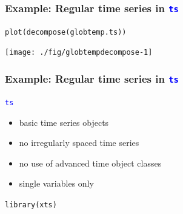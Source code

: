 \documentclass[xcolor=table, xcolor=dvipsnames]{beamer}\usepackage[]{graphicx}\usepackage[]{color}
\makeatletter
\newcommand{\hlstd}[1]{\textcolor[rgb]{0,0,0}{#1}}
\newcommand{\hlkwd}[1]{\textcolor[rgb]{0,0,1}{#1}}
\newenvironment{kframe}{%
 \def\at@end@of@kframe{}%
 \ifinner\ifhmode%
  \def\at@end@of@kframe{\end{minipage}}%
  \begin{minipage}{\columnwidth}%
 \fi\fi%
 \def\FrameCommand##1{\hskip\@totalleftmargin \hskip-\fboxsep
 \colorbox{shadecolor}{##1}\hskip-\fboxsep
     \hskip-\linewidth \hskip-\@totalleftmargin \hskip\columnwidth}%
 \MakeFramed {\advance\hsize-\width
   \@totalleftmargin\z@ \linewidth\hsize
   \@setminipage}}%
 {\par\unskip\endMakeFramed%
 \at@end@of@kframe}
\newenvironment{knitrout}{}{} %
\newcommand{\rcode}[1]{\texttt{\textcolor{Blue}{#1}}} %
\makeatother
\begin{document}

\begin{frame}[fragile]\frametitle{Example: Regular time series in \rcode{ts}} %
\begin{knitrout}
\color{fgcolor}\begin{kframe}
\begin{alltt}
\hlkwd{plot}\hlstd{(}\hlkwd{decompose}\hlstd{(globtemp.ts))}
\end{alltt}
\end{kframe}

{\centering \texttt{[image: ./fig/globtempdecompose-1]} 

}



\end{knitrout}
\end{frame}


\begin{frame}[fragile]\frametitle{Example: Regular time series in \rcode{ts}}
\rcode{ts}
\begin{itemize}
\item basic time series objects
\item no irregularly spaced time series
\item no use of advanced time object classes
\item single variables only
\end{itemize}
\begin{knitrout}
\color{fgcolor}\begin{kframe}
\begin{alltt}
\hlkwd{library}\hlstd{(xts)}
\end{alltt}
\end{kframe}
\end{knitrout}
\end{frame}

\end{document}
